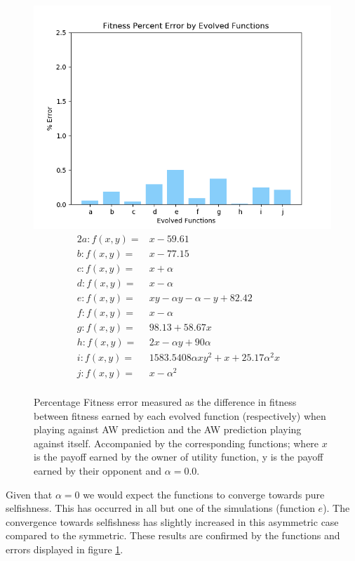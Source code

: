 \documentclass[11pt]{book}
\newcommand*{\np}{\par\noindent\newline}
\begin{document}
\begin{figure}
	\centering
	\includegraphics[scale=0.7]{resources/asymmetric_percenterror_barchart_fitness_earned_against_target_r_00.png}
	\begin{alignat*}{2}
		a: f(x, y) = & x - 59.61&\\
		b: f(x, y) = & x - 77.15&\\
		c: f(x, y) = & x + \alpha &\\
		d: f(x, y) = & x - \alpha &\\
		e: f(x, y) = & xy - \alpha y - \alpha  - y + 82.42&\\
		f: f(x, y) = & x - \alpha &\\
		g: f(x, y) = & 98.13 + 58.67x&\\
		h: f(x, y) = & 2x - \alpha y + 90\alpha &\\
		i: f(x, y) = & 1583.5408\alpha xy^2+x+25.17\alpha ^2x&\\
		j: f(x, y) = & x-\alpha ^2&\\
	\end{alignat*}
	\caption{Percentage Fitness error measured as the difference in fitness between fitness earned by each evolved function (respectively) when playing against AW prediction and the AW prediction playing against itself. Accompanied by the corresponding functions; where $x$ is the payoff earned by the owner of utility function, y is the payoff earned by their opponent and $\alpha = 0.0$.}
	\label{asymmetric_barchart_fitness_earned_against_target_r00}
\end{figure}
\np Given that $\alpha = 0$ we would expect the functions to converge towards pure selfishness.
This has occurred in all but one of the simulations (function $e$).
The convergence towards selfishness has slightly increased in this asymmetric case compared to the symmetric.
These results are confirmed by the functions and errors displayed in figure \ref{asymmetric_barchart_fitness_earned_against_target_r00}.
\end{document}
